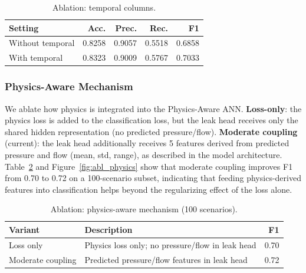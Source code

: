 \documentclass[final,5p,times,twocolumn,authoryear]{elsarticle}
\begin{document}
\begin{table}[H]
\centering
\caption{Ablation: temporal columns.}
\label{tab:abl_temporal}
\small
\begin{tabular}{@{}lrrrr@{}}
\toprule
\textbf{Setting} & \textbf{Acc.} & \textbf{Prec.} & \textbf{Rec.} & \textbf{F1} \\ \midrule
Without temporal & 0.8258 & 0.9057 & 0.5518 & 0.6858 \\
With temporal    & 0.8323 & 0.9009 & 0.5767 & 0.7033 \\ \bottomrule
\end{tabular}
\end{table}

\subsubsection{Physics-Aware Mechanism}

We ablate how physics is integrated into the Physics-Aware ANN. \textbf{Loss-only}: the physics loss is added to the classification loss, but the leak head receives only the shared hidden representation (no predicted pressure/flow). \textbf{Moderate coupling} (current): the leak head additionally receives 5 features derived from predicted pressure and flow (mean, std, range), as described in the model architecture. Table~\ref{tab:abl_physics} and Figure~\ref{fig:abl_physics} show that moderate coupling improves F1 from 0.70 to 0.72 on a 100-scenario subset, indicating that feeding physics-derived features into classification helps beyond the regularizing effect of the loss alone.

\begin{table}[H]
\centering
\caption{Ablation: physics-aware mechanism (100 scenarios).}
\label{tab:abl_physics}
\small
\begin{tabular}{@{}llr@{}}
\toprule
\textbf{Variant} & \textbf{Description} & \textbf{F1} \\ \midrule
Loss only & Physics loss only; no pressure/flow in leak head & 0.70 \\
Moderate coupling & Predicted pressure/flow features in leak head & 0.72 \\ \bottomrule
\end{tabular}
\end{table}

%


\end{document}
